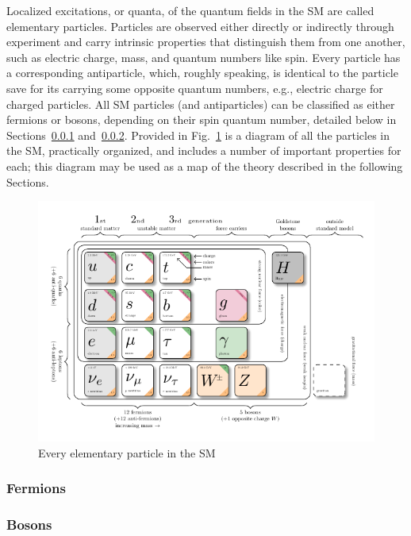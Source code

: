 Localized excitations, or quanta, of the quantum fields in the SM are called elementary particles. Particles are observed either directly or indirectly through experiment and carry intrinsic properties that distinguish them from one another, such as electric charge, mass, and quantum numbers like spin. Every particle has a corresponding antiparticle, which, roughly speaking, is identical to the particle save for its carrying some opposite quantum numbers, e.g., electric charge for charged particles. All SM particles (and antiparticles) can be classified as either fermions or bosons, depending on their spin quantum number, detailed below in Sections~\ref{sec:Fermions} and~\ref{sec:Bosons}. Provided in Fig.~\ref{fig:SM} is a diagram of all the particles in the SM, practically organized, and includes a number of important properties for each; this diagram may be used as a map of the theory described in the following Sections.

\begin{figure}[H]
    \centering
    \includegraphics[width=1\textwidth]{Images/model-physics.pdf}
    \caption{Every elementary particle in the SM}
    \label{fig:SM}
\end{figure}

\subsubsection{Fermions} \label{sec:Fermions}


\subsubsection{Bosons} \label{sec:Bosons}
